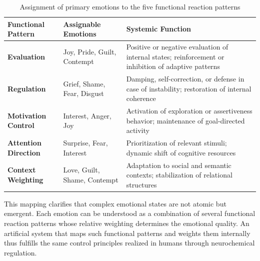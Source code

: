 \begin{table}[H]
    \renewcommand{\arraystretch}{1.5}
    \centering
    \begin{tabular}{L{3cm}|L{6cm}|L{6cm}}
        \textbf{Functional Pattern} & \textbf{Assignable Emotions} & \textbf{Systemic Function} \\
        \hline
        \textbf{Evaluation} & Joy, Pride, Guilt, Contempt & Positive or negative evaluation of internal states; reinforcement or inhibition of adaptive patterns \\
        \textbf{Regulation} & Grief, Shame, Fear, Disgust & Damping, self-correction, or defense in case of instability; restoration of internal coherence \\
        \textbf{Motivation Control} & Interest, Anger, Joy & Activation of exploration or assertiveness behavior; maintenance of goal-directed activity \\
        \textbf{Attention Direction} & Surprise, Fear, Interest & Prioritization of relevant stimuli; dynamic shift of cognitive resources \\
        \textbf{Context Weighting} & Love, Guilt, Shame, Contempt & Adaptation to social and semantic contexts; stabilization of relational structures \\
    \end{tabular}
    \caption{Assignment of primary emotions to the five functional reaction patterns}
    \label{tab:emotion_funktional}
\end{table}

\begin{reflexion}
    This mapping clarifies that complex emotional states are not atomic but emergent.
    Each emotion can be understood as a combination of several functional reaction patterns whose relative weighting determines the emotional quality.
    An artificial system that maps such functional patterns and weights them internally thus fulfills the same control principles realized in humans through neurochemical regulation.
\end{reflexion}

